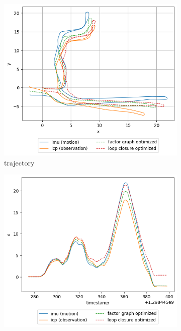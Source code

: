 \documentclass[conference]{IEEEtran}
\begin{document}
\begin{figure}[htbp]
    \centering
    \begin{subfigure}{0.24\textwidth}
        \includegraphics[width=\linewidth]{../img/trj_20.png}
        \caption{trajectory}
        \label{fig:trj_20}
    \end{subfigure}
    \hfill
    \begin{subfigure}{0.24\textwidth}
        \includegraphics[width=\linewidth]{../img/trj_20_x.png}

\end{subfigure}
\end{figure}
\end{document}
